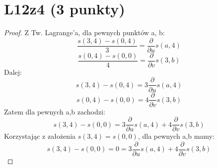 \documentclass{article}
\begin{document}
\section{L12z4 (3 punkty)}
\begin{proof}
Z Tw. Lagrange'a, dla pewnych punktów a, b:
$$
\frac{s(3,4) - s(0,4)}{3} = \frac{\partial}{\partial u} s(a,4)
$$
$$
\frac{s(0,4) - s(0,0)}{4} = \frac{\partial}{\partial v} s(3,b)
$$
Dalej:
$$
s(3,4) - s(0,4) = 3\frac{\partial}{\partial u} s(a,4)
$$
$$
s(0,4) - s(0,0) = 4\frac{\partial}{\partial v} s(3,b)
$$
Zatem dla pewnych a,b zachodzi:
$$
s(3,4) - s(0,0) = 3\frac{\partial}{\partial u} s(a,4) + 4\frac{\partial}{\partial v} s(3,b)
$$
Korzystając z założenia $s(3,4) = s(0,0)$, dla pewnych a,b mamy:
$$
s(3,4) - s(0,0) = 0 = 3\frac{\partial}{\partial u} s(a,4) + 4\frac{\partial}{\partial v} s(3,b)
$$
\end{proof}
\end{document}
